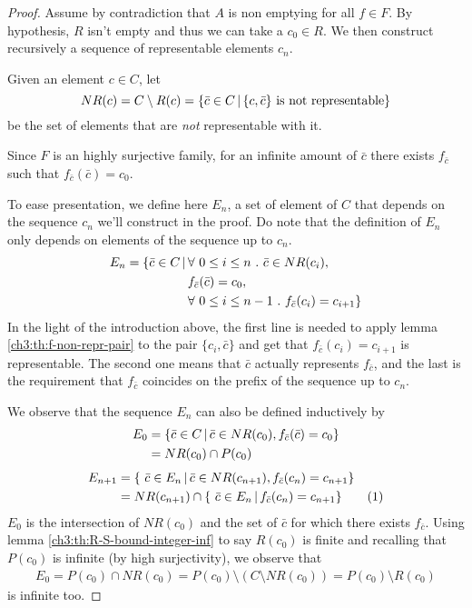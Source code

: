 \begin{proof}
	Assume by contradiction that $A$ is non emptying for all $f \in F$. By hypothesis, $R$ isn't empty and thus we can take a $c_0 \in R$. We then construct recursively a sequence of representable elements $c_n$.

	Given an element $c \in C$, let
	\[
	NR(c) = C \setminus R(c) = \{ \bar{c} \in C \,\vert\, \{ c, \bar{c} \} \text{ is not representable} \}
	\]
	be the set of elements that are \textit{not} representable with it.

	Since $F$ is an highly surjective family, for an infinite amount of $\bar{c}$ there exists $f_{\bar{c}}$ such that $f_{\bar{c}}(\bar{c}) = c_0$.

	To ease presentation, we define here $E_n$, a set of element of $C$ that depends on the sequence $c_n$ we'll construct in the proof. Do note that the definition of $E_n$ only depends on elements of the sequence up to $c_n$.
	\begin{align*}
		E_n = \{\bar{c} \in C \svert & \forall\ 0 \le i \le n \ .\ \bar{c} \in NR(c_i), \\
		& f_{\bar{c}}(\bar{c}) = c_0, \\
		& \forall\ 0 \le i \le n - 1 \ .\ f_{\bar{c}}(c_i) = c_{i + 1} \}
	\end{align*}
	In the light of the introduction above, the first line is needed to apply lemma \ref{ch3:th:f-non-repr-pair} to the pair $\{ c_i, \bar{c} \}$ and get that $f_{\bar{c}}(c_i) = c_{i+1}$ is representable. The second one means that $\bar{c}$ actually represents $f_{\bar{c}}$, and the last is the requirement that $f_{\bar{c}}$ coincides on the prefix of the sequence up to $c_n$.

	We observe that the sequence $E_n$ can also be defined inductively by
	\begin{align*}
		E_0 &= \{ \bar{c} \in C \,\vert\, \bar{c} \in NR(c_0), f_{\bar{c}}(\bar{c}) = c_0 \} \\
		&= NR(c_0) \cap P(c_0)
	\end{align*}
	\begin{align*}
		E_{n+1} &= \{\ \bar{c} \in E_n \svert \bar{c} \in NR(c_{n+1}), f_{\bar{c}}(c_n) = c_{n+1} \} \\
		&= NR(c_{n+1}) \cap \{\ \bar{c} \in E_n \svert f_{\bar{c}}(c_n) = c_{n+1} \} \addtocounter{equation}{1}\tag{\theequation} \label{ch4:eq:En-relation}
	\end{align*}
	$E_0$ is the intersection of $NR(c_0)$ and the set of $\bar{c}$ for which there exists $f_{\bar{c}}$. Using lemma \ref{ch3:th:R-S-bound-integer-inf} to say $R(c_0)$ is finite and recalling that $P(c_0)$ is infinite (by high surjectivity), we observe that
	\begin{align*}
		E_0 = P(c_0) \cap NR(c_0) = P(c_0) \setminus (C \setminus NR(c_0)) = P(c_0) \setminus R(c_0)
	\end{align*}
	is infinite too.


\end{proof}
